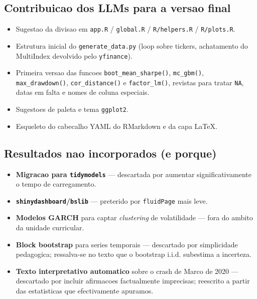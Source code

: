 \documentclass[11pt,a4paper]{article}
\begin{document}
\subsection*{Contribuicao dos LLMs para a versao final}
\begin{itemize}[leftmargin=*]
  \item Sugestao da divisao em \texttt{app.R} / \texttt{global.R} /
        \texttt{R/helpers.R} / \texttt{R/plots.R}.
  \item Estrutura inicial do \texttt{generate\_data.py} (loop sobre
        tickers, achatamento do MultiIndex devolvido pelo
        \texttt{yfinance}).
  \item Primeira versao das funcoes \texttt{boot\_mean\_sharpe()},
        \texttt{mc\_gbm()}, \texttt{max\_drawdown()},
        \texttt{cor\_distance()} e \texttt{factor\_lm()}, revistas
        para tratar \texttt{NA}, datas em falta e nomes de coluna
        especiais.
  \item Sugestoes de paleta e tema \texttt{ggplot2}.
  \item Esqueleto do cabecalho YAML do RMarkdown e da capa LaTeX.
\end{itemize}

\subsection*{Resultados nao incorporados (e porque)}
\begin{itemize}[leftmargin=*]
  \item \textbf{Migracao para \texttt{tidymodels}} --- descartada por
        aumentar significativamente o tempo de carregamento.
  \item \textbf{\texttt{shinydashboard}/\texttt{bslib}} --- preterido
        por \texttt{fluidPage} mais leve.
  \item \textbf{Modelos GARCH} para captar \emph{clustering} de
        volatilidade --- fora do ambito da unidade curricular.
  \item \textbf{Block bootstrap} para series temporais ---
        descartado por simplicidade pedagogica; ressalva-se no texto
        que o bootstrap i.i.d. subestima a incerteza.
  \item \textbf{Texto interpretativo automatico} sobre o crash de
        Marco de 2020 --- descartado por incluir afirmacoes
        factualmente imprecisas; reescrito a partir das estatisticas
        que efectivamente apuramos.
\end{itemize}
\end{document}
